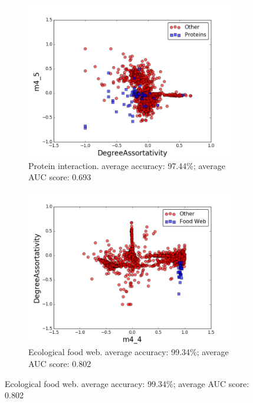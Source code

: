\documentclass{article}
\begin{document}
\begin{figure}[H]
\begin{subfigure}{0.48\textwidth}
\includegraphics[width=\linewidth]{figs/one_by_many/protein/2d.png}
\caption{Protein interaction. average accuracy: 97.44\%; average AUC score: 0.693} \label{protein_2d}
\end{subfigure}\hspace*{\fill}
\begin{subfigure}{0.48\textwidth}
\includegraphics[width=\linewidth]{figs/one_by_many/food_web/2d.png}
\caption{Ecological food web. average accuracy: 99.34\%; average AUC score: 0.802} \label{foodweb_2d}
\end{subfigure}


\end{figure}
\end{document}
